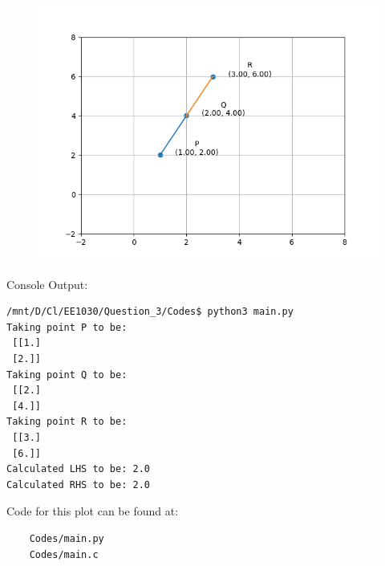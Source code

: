 \documentclass[journal]{IEEEtran}
\begin{document}
\newpage

\begin{figure}[H]
	\centering
	\includegraphics[width=0.75\columnwidth]{Figures/Figure.png}
	\label{fig}
\end{figure}


Console Output:
\begin{verbatim}
/mnt/D/Cl/EE1030/Question_3/Codes$ python3 main.py 
Taking point P to be:
 [[1.]
 [2.]]
Taking point Q to be:
 [[2.]
 [4.]]
Taking point R to be:
 [[3.]
 [6.]]
Calculated LHS to be: 2.0
Calculated RHS to be: 2.0
\end{verbatim}

Code for this plot can be found at:
\begin{lstlisting}
    Codes/main.py
    Codes/main.c
\end{lstlisting}
\end{document}
